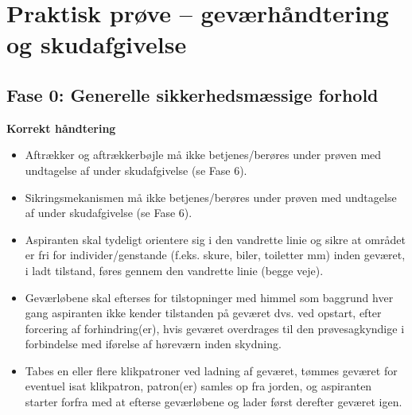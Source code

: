 \newcommand{\fejlkode}[1]{\textcolor{jagtgroen}{\textbf{#1}}}

\section{Praktisk prøve -- geværhåndtering og skudafgivelse}

\subsection*{\textcolor{jagtgroen}{Fase 0: Generelle sikkerhedsmæssige forhold}}

\textbf{Korrekt håndtering}
\begin{itemize}\setlength{\itemsep}{2pt}
  \item Aftrækker og aftrækkerbøjle må ikke betjenes/berøres under prøven med undtagelse af under skudafgivelse (se Fase 6).
  \item Sikringsmekanismen må ikke betjenes/berøres under prøven med undtagelse af under skudafgivelse (se Fase 6).
  \item Aspiranten skal tydeligt orientere sig i den vandrette linie og sikre at området er fri for individer/genstande (f.eks. skure, biler, toiletter mm) inden geværet, i ladt tilstand, føres gennem den vandrette linie (begge veje).
  \item Geværløbene skal efterses for tilstopninger med himmel som baggrund hver gang aspiranten ikke kender tilstanden på geværet dvs. ved opstart, efter forcering af forhindring(er), hvis geværet overdrages til den prøvesagkyndige i forbindelse med iførelse af høreværn inden skydning.
  \item Tabes en eller flere klikpatroner ved ladning af geværet, tømmes geværet for eventuel isat klikpatron, patron(er) samles op fra jorden, og aspiranten starter forfra med at efterse geværløbene og lader først derefter geværet igen.
\end{itemize}

